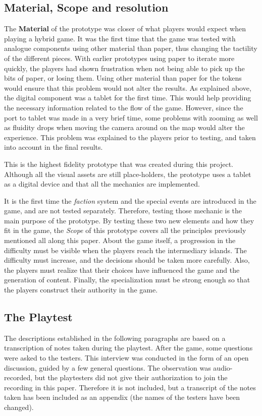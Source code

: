 \subsection{Material, Scope and resolution}
The \textbf{Material} of the prototype was closer of what players would expect when playing a hybrid game. It was the first time that the game was tested with analogue components using other material than paper, thus changing the tactility of the different pieces. With earlier prototypes using paper to iterate more quickly, the players had shown frustration when not being able to pick up the bits of paper, or losing them. Using other material than paper for the tokens would ensure that this problem would not alter the results. As explained above, the digital component was a tablet for the first time. This would help providing the necessary information related to the flow of the game. However, since the port to tablet was made in a very brief time, some problems with zooming as well as fluidity drops when moving the camera around on the map would alter the experience. This problem was explained to the players prior to testing, and taken into account in the final results.


This is the highest fidelity prototype that was created during this project. Although all the visual assets are still place-holders, the prototype uses a tablet as a digital device and that all the mechanics are implemented. 

It is the first time the \textit{faction} system and the special events are introduced in the game, and are not tested separately. Therefore, testing those mechanic is the main purpose of the prototype. By testing these two new elements and how they fit in the game, the \textit{Scope} of this prototype covers all the principles previously mentioned all along this paper. About the game itself, a progression in the difficulty must be visible when the players reach the intermediary islands. The difficulty must increase, and the decisions should be taken more carefully. Also, the players must realize that their choices have influenced the game and the generation of content. Finally, the specialization must be strong enough so that the players construct their authority in the game. 

\subsection{The Playtest}
The descriptions established in the following paragraphs are based on a transcription of notes taken during the playtest. After the game, some questions were asked to the testers. This interview was conducted in the form of an open discussion, guided by a few general questions. The observation was audio-recorded, but the playtesters did not give their authorization to join the recording in this paper. Therefore it is not included, but a transcript of the notes taken has been included as an appendix (the names of the testers have been changed).
